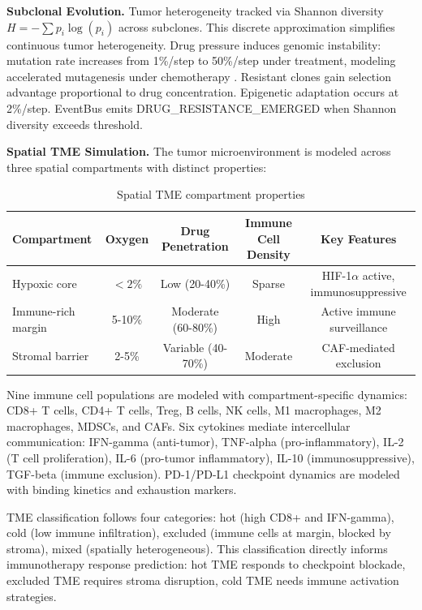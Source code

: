 \documentclass[11pt,a4paper]{article}
\begin{document}
\textbf{Subclonal Evolution.} Tumor heterogeneity tracked via Shannon diversity $H = -\sum p_i \log(p_i)$ across subclones. This discrete approximation simplifies continuous tumor heterogeneity. Drug pressure induces genomic instability: mutation rate increases from 1\%/step to 50\%/step under treatment, modeling accelerated mutagenesis under chemotherapy \citep{ding2012}. Resistant clones gain selection advantage proportional to drug concentration. Epigenetic adaptation occurs at 2\%/step. EventBus emits DRUG\_RESISTANCE\_EMERGED when Shannon diversity exceeds threshold.

\textbf{Spatial TME Simulation.} The tumor microenvironment is modeled across three spatial compartments with distinct properties:

\begin{table}[H]
\centering
\caption{Spatial TME compartment properties}
\label{tab:tme_compartment}
\begin{tabular}{lcccc}
\toprule
\textbf{Compartment} & \textbf{Oxygen} & \textbf{Drug Penetration} & \textbf{Immune Cell Density} & \textbf{Key Features} \\
\midrule
Hypoxic core & $<2\%$ & Low (20-40\%) & Sparse & HIF-1$\alpha$ active, immunosuppressive \\
Immune-rich margin & 5-10\% & Moderate (60-80\%) & High & Active immune surveillance \\
Stromal barrier & 2-5\% & Variable (40-70\%) & Moderate & CAF-mediated exclusion \\
\bottomrule
\end{tabular}
\end{table}

Nine immune cell populations are modeled with compartment-specific dynamics: CD8+ T cells, CD4+ T cells, Treg, B cells, NK cells, M1 macrophages, M2 macrophages, MDSCs, and CAFs. Six cytokines mediate intercellular communication: IFN-gamma (anti-tumor), TNF-alpha (pro-inflammatory), IL-2 (T cell proliferation), IL-6 (pro-tumor inflammatory), IL-10 (immunosuppressive), TGF-beta (immune exclusion). PD-1/PD-L1 checkpoint dynamics are modeled with binding kinetics and exhaustion markers.

TME classification follows four categories: hot (high CD8+ and IFN-gamma), cold (low immune infiltration), excluded (immune cells at margin, blocked by stroma), mixed (spatially heterogeneous). This classification directly informs immunotherapy response prediction: hot TME responds to checkpoint blockade, excluded TME requires stroma disruption, cold TME needs immune activation strategies.
\end{document}
